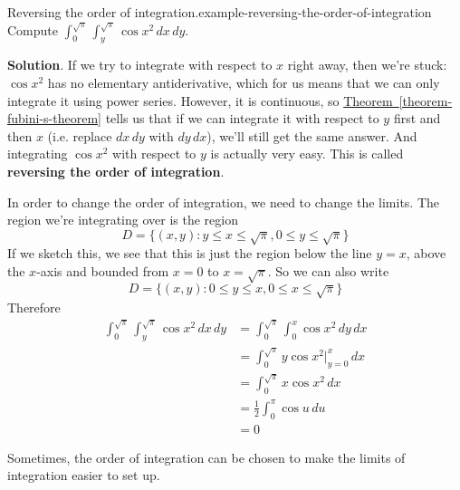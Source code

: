 \documentclass[10pt,]{book}
\newcommand{\terminology}[1]{\textbf{#1}}
\numberwithin{equation}{section}
\begin{document}
\begin{example}{Reversing the order of integration.}{example-reversing-the-order-of-integration}%
\hypertarget{p-1476}{}%
Compute \(\int_{0}^{\sqrt{\pi}}\int_{y}^{\sqrt{\pi}}\cos x^{2}\,dx\,dy\).%
\par\smallskip%
\noindent\textbf{Solution}.\hypertarget{solution-242}{}\quad%
\hypertarget{p-1477}{}%
If we try to integrate with respect to \(x\) right away, then we're stuck: \(\cos x^{2}\) has no elementary antiderivative, which for us means that we can only integrate it using power series. However, it is continuous, so \hyperref[theorem-fubini-s-theorem]{Theorem~\ref{theorem-fubini-s-theorem}} tells us that if we can integrate it with respect to \(y\) first and then \(x\) (i.e. replace \(dx\,dy\) with \(dy\,dx\)), we'll still get the same answer. And integrating \(\cos x^{2}\) with respect to \(y\) is actually very easy. This is called \terminology{reversing the order of integration}.%
\par
\hypertarget{p-1478}{}%
In order to change the order of integration, we need to change the limits. The region we're integrating over is the region%
\begin{equation*}
D = \{(x,y) : y\leq x\leq \sqrt{\pi}, 0\leq y\leq\sqrt{\pi}\}
\end{equation*}
If we sketch this, we see that this is just the region below the line \(y = x\), above the \(x\)-axis and bounded from \(x=0\) to \(x=\sqrt{\pi}\). So we can also write%
\begin{equation*}
D = \{(x,y) : 0\leq y\leq x, 0\leq x\leq\sqrt{\pi}\}
\end{equation*}
Therefore%
\begin{align*}
\int_{0}^{\sqrt{\pi}}\int_{y}^{\sqrt{\pi}}\cos x^{2}\,dx\,dy & = \int_{0}^{\sqrt{\pi}}\int_{0}^{x}\cos x^{2}\,dy\,dx \\
& = \int_{0}^{\sqrt{\pi}}y\cos x^{2}\bigg|_{y=0}^{x}\,dx \\
& = \int_{0}^{\sqrt{\pi}}x\cos x^{2}\,dx \\
& = \frac{1}{2}\int_{0}^{\pi}\cos u\,du \\
& = 0 
\end{align*}
%
\end{example}
\hypertarget{p-1479}{}%
Sometimes, the order of integration can be chosen to make the limits of integration easier to set up.%
\end{document}
